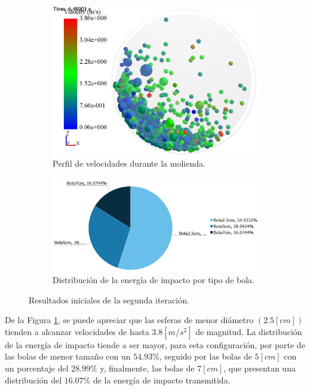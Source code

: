 \begin{figure}[h!]
	\centering
	\begin{subfigure}[b]{0.66\textwidth}
		\centering
		\includegraphics[width=\textwidth]{Images/Resultados/Sim2/sim2.PNG}
		\caption{Perfil de velocidades durante la molienda.}
	\end{subfigure}
	\hfill
	\begin{subfigure}[b]{0.9\textwidth}
		\centering
		\includegraphics[width=\textwidth]{Images/Resultados/Sim2/dist2.PNG}
	\caption{Distribuci\'on de la energ\'ia de impacto por tipo de bola.}
	\end{subfigure}
	\caption{Resultados iniciales de la segunda iteraci\'on.}
	\label{resul2}
\end{figure}

\noindent
\justify

De la Figura \ref{resul2}, se puede apreciar que las esferas de menor di\'ametro $\left( 2.5 [cm] \right)$ tienden a alcanzar velocidades de hasta $3.8 \left[m/s^2 \right]$ de magnitud. La distribuci\'on de la energ\'ia de impacto tiende a ser mayor, para esta configuraci\'on, por parte de las bolas de menor tama\~no con un $54.93 \%$, seguido por las bolas de $5 [cm]$ con un porcentaje del $28.99 \%$ y, finalmente, las bolas de $7 [cm]$, que presentan una distribuci\'on del $16.07 \%$ de la energ\'ia de impacto transmitida.

